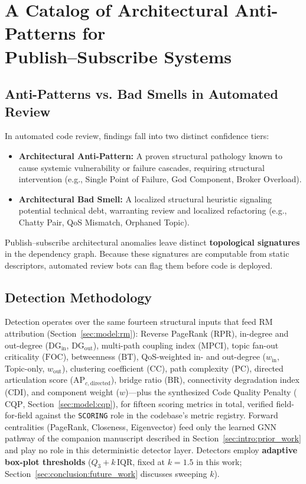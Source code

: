 \section[Architectural Anti-Pattern Catalog for Publish--Subscribe Systems]{A Catalog of Architectural Anti-Patterns for\\ Publish--Subscribe Systems}
\label{sec:antipattern_catalog}

\subsection{Anti-Patterns vs. Bad Smells in Automated Review}
\label{sec:catalog:taxonomy}

In automated code review, findings fall into two distinct confidence tiers:
\begin{itemize}
    \item \textbf{Architectural Anti-Pattern:} A proven structural pathology known to cause systemic vulnerability or failure cascades, requiring structural intervention (e.g., Single Point of Failure, God Component, Broker Overload).
    \item \textbf{Architectural Bad Smell:} A localized structural heuristic signaling potential technical debt, warranting review and localized refactoring (e.g., Chatty Pair, QoS Mismatch, Orphaned Topic).
\end{itemize}

Publish--subscribe architectural anomalies leave distinct \textbf{topological signatures} in the dependency graph. Because these signatures are computable from static descriptors, automated review bots can flag them before code is deployed.

\subsection{Detection Methodology}
\label{sec:catalog:methodology}

Detection operates over the same fourteen structural inputs that feed RM attribution (Section~\ref{sec:model:rm}): Reverse PageRank ($\mathrm{RPR}$), in-degree and out-degree ($\mathrm{DG}_{\text{in}}$, $\mathrm{DG}_{\text{out}}$), multi-path coupling index ($\mathrm{MPCI}$), topic fan-out criticality ($\mathrm{FOC}$), betweenness ($\mathrm{BT}$), QoS-weighted in- and out-degree ($w_{\text{in}}$, Topic-only, $w_{\text{out}}$), clustering coefficient ($\mathrm{CC}$), path complexity ($\mathrm{PC}$), directed articulation score ($\mathrm{AP}_{c,\text{directed}}$), bridge ratio ($\mathrm{BR}$), connectivity degradation index ($\mathrm{CDI}$), and component weight ($w$)---plus the synthesized Code Quality Penalty ($\mathrm{CQP}$, Section~\ref{sec:model:cqp}), for fifteen scoring metrics in total, verified field-for-field against the \texttt{SCORING} role in the codebase's metric registry. Forward centralities (PageRank, Closeness, Eigenvector) feed only the learned GNN pathway of the companion manuscript described in Section~\ref{sec:intro:prior_work} and play no role in this deterministic detector layer. Detectors employ \textbf{adaptive box-plot thresholds} ($Q_3 + k\,\mathrm{IQR}$, fixed at $k=1.5$ in this work; Section~\ref{sec:conclusion:future_work} discusses sweeping $k$).

